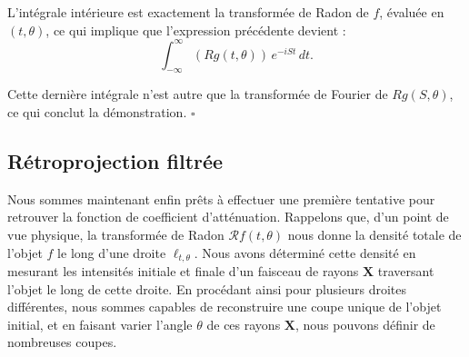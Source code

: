 L'intégrale intérieure est exactement la transformée de Radon de $f$,
évaluée en $(t,\theta)$, ce qui implique que l'expression précédente devient :
\begin{equation}
\int_{-\infty}^{\infty}
(Rg(t,\theta))\,e^{-iSt}\,dt.
\end{equation}

Cette dernière intégrale n'est autre que la transformée de Fourier de
$Rg(S,\theta)$, ce qui conclut la démonstration.
\hfill$\square$

\subsection{Rétroprojection filtrée}
Nous sommes maintenant enfin prêts à effectuer une première tentative pour retrouver la fonction de coefficient d'atténuation.
Rappelons que, d'un point de vue physique, la transformée de Radon
$\mathcal{R}f(t,\theta)$ nous donne la densité totale de l'objet $f$ le long d'une droite
$\ell_{t,\theta}$.
Nous avons déterminé cette densité en mesurant les intensités initiale et finale
d'un faisceau de rayons $\mathbf{X}$ traversant l'objet le long de cette droite.
En procédant ainsi pour plusieurs droites différentes, nous sommes capables de
reconstruire une coupe unique de l'objet initial, et en faisant varier l'angle
$\theta$ de ces rayons $\mathbf{X}$, nous pouvons définir de nombreuses coupes.

